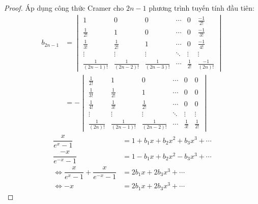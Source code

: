 \begin{proof}
    Áp dụng công thức Cramer cho $2n-1$ phương trình tuyến tính đầu tiên:
    \begin{align*}
        b_{2n-1} & =
        \begin{vmatrix}
            1                 & 0                 & 0                 & \cdots & 0            & \frac{-1}{2!}    \\
            \frac{1}{2!}      & 1                 & 0                 & \cdots & 0            & \frac{-1}{3!}    \\
            \frac{1}{3!}      & \frac{1}{2!}      & 1                 & \cdots & 0            & \frac{-1}{4!}    \\
            \vdots            & \vdots            & \vdots            & \ddots & \vdots       & \vdots           \\
            \frac{1}{(2n-1)!} & \frac{1}{(2n-2)!} & \frac{1}{(2n-3)!} & \cdots & \frac{1}{2!} & \frac{-1}{(2n)!}
        \end{vmatrix} \\
                 & = -
        \begin{vmatrix}
            \frac{1}{2!}    & 1                 & 0                 & \cdots & 0            & 0            \\
            \frac{1}{3!}    & \frac{1}{2!}      & 1                 & \cdots & 0            & 0            \\
            \frac{1}{4!}    & \frac{1}{3!}      & \frac{1}{2!}      & \cdots & 0            & 0            \\
            \vdots          & \vdots            & \vdots            & \ddots & \vdots       & \vdots       \\
            \frac{1}{(2n)!} & \frac{1}{(2n-1)!} & \frac{1}{(2n-2)!} & \cdots & \frac{1}{3!} & \frac{1}{2!}
        \end{vmatrix}
    \end{align*}
    \begin{align*}
        \dfrac{x}{e^{x}-1}                                             & = 1 + b_{1}x + b_{2}x^{2} + b_{3}x^{3} + \cdots \\
        \dfrac{-x}{e^{-x}-1}                                           & = 1 - b_{1}x + b_{2}x^{2} - b_{3}x^{3} + \cdots \\
        \Longleftrightarrow \dfrac{x}{e^{x} - 1} + \dfrac{x}{e^{-x}-1} & = 2b_{1}x + 2b_{3}x^{3} + \cdots                \\
        \Longleftrightarrow -x                                         & = 2b_{1}x + 2b_{3}x^{3} + \cdots
    \end{align*}
    

\end{proof}
